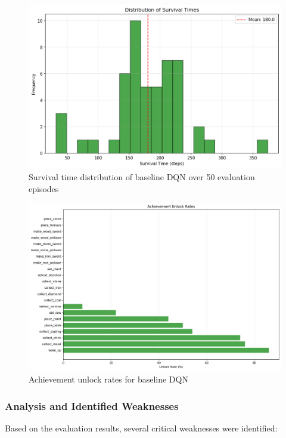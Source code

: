 \documentclass[twocolumn]{article}
\begin{document}
\begin{figure}[H]
    \centering
    \includegraphics[width=0.8\linewidth]{images/DQNBaselinesurvive.png}
    \caption{Survival time distribution of baseline DQN over 50 evaluation episodes}
    \label{fig:dqn_baseline_survival}
\end{figure}

\begin{figure}[H]
    \centering
    \includegraphics[width=0.8\linewidth]{images/DQNBaselineAchieve.png}
    \caption{Achievement unlock rates for baseline DQN}
    \label{fig:dqn_baseline_achievements}
\end{figure}

\subsubsection*{Analysis and Identified Weaknesses}

Based on the evaluation results, several critical weaknesses were identified:
\end{document}
